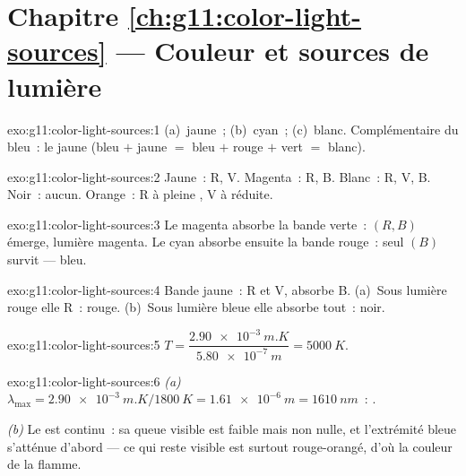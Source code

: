 \section*{Chapitre \ref{ch:g11:color-light-sources} --- Couleur et sources de lumière}

\begin{solution}{exo:g11:color-light-sources:1}
(a)~jaune~; (b)~cyan~; (c)~blanc. Complémentaire du bleu~: le jaune
(bleu $+$ jaune $=$ bleu $+$ rouge $+$ vert $=$ blanc).
\end{solution}

\begin{solution}{exo:g11:color-light-sources:2}
Jaune~: R, V. Magenta~: R, B. Blanc~: R, V, B. Noir~: aucun. Orange~:
R à pleine , V à
 réduite.
\end{solution}

\begin{solution}{exo:g11:color-light-sources:3}
Le magenta absorbe la bande verte~: $(R, B)$ émerge, lumière magenta.
Le  cyan absorbe ensuite la bande
rouge~: seul $(B)$ survit --- bleu.
\end{solution}

\begin{solution}{exo:g11:color-light-sources:4}
Bande jaune~:  R et V, absorbe B.
(a)~Sous lumière rouge elle  R~:
rouge. (b)~Sous lumière bleue elle absorbe tout~: noir.
\end{solution}

\begin{solution}{exo:g11:color-light-sources:5}
$T = \dfrac{\qty{2.90e-3}{m.K}}{\qty{5.80e-7}{m}} = \qty{5000}{K}$.
\end{solution}

\begin{solution}{exo:g11:color-light-sources:6}
\emph{(a)} $\lambda_{\max} = \qty{2.90e-3}{m.K}/\qty{1800}{K}
= \qty{1.61e-6}{m} = \qty{1610}{nm}$~:
.

\emph{(b)} Le  est continu~: sa queue visible
est faible mais non nulle, et l'extrémité bleue s'atténue d'abord ---
ce qui reste visible est surtout rouge-orangé, d'où la couleur de la
flamme.
\end{solution}

